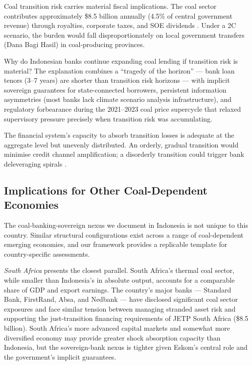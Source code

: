 Coal transition risk carries material fiscal implications. The coal sector contributes approximately \$8.5 billion annually (4.5\% of central government revenue) through royalties, corporate taxes, and SOE dividends \citep{IESR2023}. Under a 2\textdegree C scenario, the burden would fall disproportionately on local government transfers (Dana Bagi Hasil) in coal-producing provinces.

Why do Indonesian banks continue expanding coal lending if transition risk is material? The explanation combines a ``tragedy of the horizon'' --- bank loan tenors (3--7 years) are shorter than transition risk horizons \citep{Carattini2023} --- with implicit sovereign guarantees for state-connected borrowers, persistent information asymmetries (most banks lack climate scenario analysis infrastructure), and regulatory forbearance during the 2021--2023 coal price supercycle that relaxed supervisory pressure precisely when transition risk was accumulating.

The financial system's capacity to absorb transition losses is adequate at the aggregate level but unevenly distributed. An orderly, gradual transition would minimise credit channel amplification; a disorderly transition could trigger bank deleveraging spirals \citep{Bernanke1999, Roncoroni2021}.



\subsection{Implications for Other Coal-Dependent Economies}
\label{subsec:comparative}

The coal-banking-sovereign nexus we document in Indonesia is not unique to this country. Similar structural configurations exist across a range of coal-dependent emerging economies, and our framework provides a replicable template for country-specific assessments.

\textit{South Africa} presents the closest parallel. South Africa's thermal coal sector, while smaller than Indonesia's in absolute output, accounts for a comparable share of GDP and export earnings. The country's major banks --- Standard Bank, FirstRand, Absa, and Nedbank --- have disclosed significant coal sector exposures and face similar tension between managing stranded asset risk and supporting the just-transition financing requirements of JETP South Africa (\$8.5 billion). South Africa's more advanced capital markets and somewhat more diversified economy may provide greater shock absorption capacity than Indonesia, but the sovereign-bank nexus is tighter given Eskom's central role and the government's implicit guarantees.

